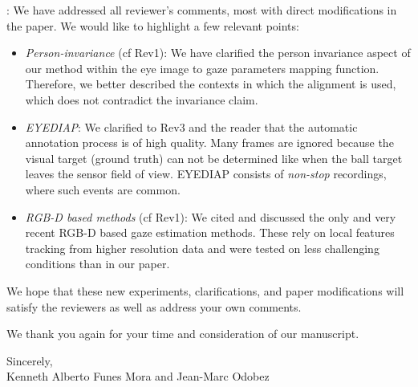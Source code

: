 \documentclass[12pt]{article}
\begin{document}
: We have addressed all reviewer's comments, most with direct modifications in the paper. We would like to
highlight a few relevant points:
\begin{itemize}
 \item {\em Person-invariance} (cf Rev1): We have clarified the person invariance aspect of our method within the eye image
 to gaze parameters mapping function. Therefore, we better described the contexts  in which the alignment is used,
 which does not contradict the invariance claim.
%
 \item {\em EYEDIAP}: We clarified to Rev3 and the reader that the automatic annotation process is of high quality. Many frames are ignored because
 the visual target (ground truth) can not be determined like when the ball target leaves the sensor  field of view. EYEDIAP consists
 of {\em non-stop} recordings, where such events are common.
%
 \item {\em RGB-D based methods} (cf Rev1): We cited and discussed the only and very recent RGB-D based gaze estimation methods.
 These rely on local features tracking from higher resolution data and were tested on less challenging conditions than in our paper.
\end{itemize}

We hope that these new experiments, clarifications, and paper modifications will satisfy the reviewers as well as address your own comments. 

\vspace*{2mm}
We thank you again for your time and consideration of our manuscript.




\vspace*{8mm}

\noindent Sincerely,\\[3mm]
%
Kenneth Alberto Funes Mora and Jean-Marc Odobez



\newpage
\end{document}
